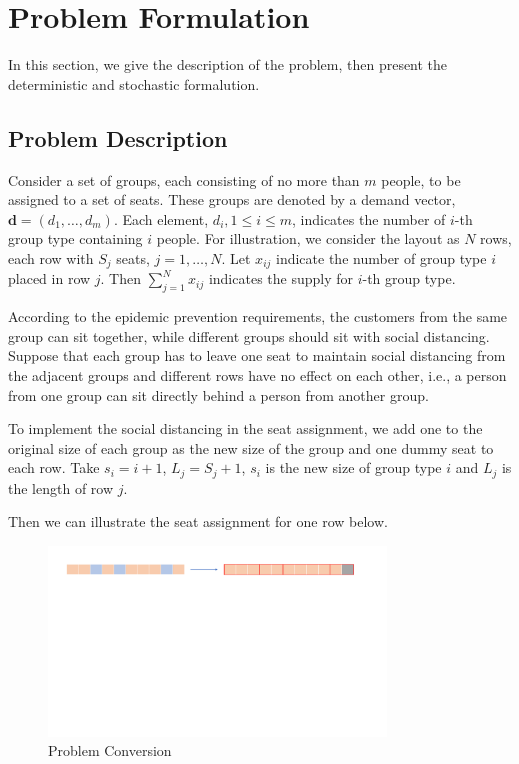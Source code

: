 \section{Problem Formulation}
In this section, we give the description of the problem, then present the deterministic and stochastic formalution.

\subsection{Problem Description}

Consider a set of groups, each consisting of no more than $m$ people, to be assigned to a set of seats. These groups are denoted by a demand vector, $\mathbf{d} = (d_1, \ldots, d_m)$. Each element, $d_i, 1 \leq i \leq m$, indicates the number of $i$-th group type containing $i$ people. For illustration, we consider the layout as $N$ rows, each row with $S_{j}$ seats, $j = 1, \ldots, N$. Let $x_{ij}$ indicate the number of group type $i$ placed in row $j$. Then $\sum_{j=1}^{N} x_{ij}$ indicates the supply for $i$-th group type.


According to the epidemic prevention requirements, the customers from the same group can sit together, while different groups should sit with social distancing. 
Suppose that each group has to leave one seat to maintain social distancing from the adjacent groups and different rows have no effect on each other, i.e., a person from one group can sit directly behind a person from another group.

To implement the social distancing in the seat assignment, we add one to the original size of each group as the new size of the group and one dummy seat to each row. Take $s_{i} = i + 1$, $L_{j} = S_{j} +1$, $s_{i}$ is the new size of group type $i$ and $L_{j}$ is the length of row $j$.

Then we can illustrate the seat assignment for one row below. 

\begin{figure}[ht]
    \centering
    \includegraphics[width = 0.8\textwidth]{./Figures/dummy_seat.pdf}
    \caption{Problem Conversion}
\end{figure}

